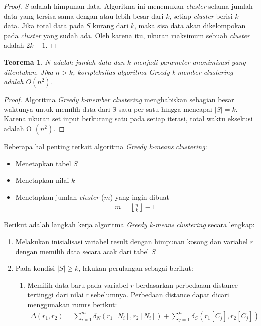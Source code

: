 \documentclass[a4paper,twoside]{article}
\newtheorem{theorem}{Teorema}
\begin{document}
\begin{enumerate}
\begin{proof}
$S$ adalah himpunan data. Algoritma ini menemukan \textit{cluster} selama jumlah data yang tersisa sama dengan atau lebih besar dari $k$, setiap \textit{cluster} berisi $k$ data. Jika total data pada $S$ kurang dari $k$, maka sisa data akan dikelompokan pada  \textit{cluster} yang sudah ada. Oleh karena itu, ukuran maksimum sebuah \textit{cluster} adalah $2k-1$.
\end{proof}

\begin{theorem}
$N$ adalah jumlah data dan $k$ menjadi parameter anonimisasi yang ditentukan. Jika $n > k$, kompleksitas algoritma \textit{Greedy k-member clustering} adalah $O(n^2)$.
\end{theorem}

\begin{proof}
Algoritma \textit{Greedy k-member clustering} menghabiskan sebagian besar waktunya untuk memilih data dari S satu per satu hingga mencapai $|S| = k$. Karena ukuran set input berkurang satu pada setiap iterasi, total waktu eksekusi adalah O $(n^2)$.
\end{proof}

\noindent Beberapa hal penting terkait algoritma \textit{Greedy k-means clustering}:

\begin{itemize}
\item Menetapkan tabel $S$  
\item Menetapkan nilai $k$
\item Menetapkan jumlah \textit{cluster} ($m$) yang ingin dibuat
\begin{align}
m = \left \lfloor \frac{n}{k} \right \rfloor - 1
\end{align}
\end{itemize}


\noindent Berikut adalah langkah kerja algoritma \textit{Greedy k-means clustering} secara lengkap:

\begin{enumerate}
\item Melakukan inisialisasi variabel result dengan himpunan kosong dan variabel $r$ dengan memilih data secara acak dari tabel $S$

\item Pada kondisi $|S| \geq k$, lakukan perulangan sebagai berikut:

\begin{enumerate}
\item Memilih data baru pada variabel $r$ berdasarkan perbedaaan distance tertinggi dari nilai $r$ sebelumnya. Perbedaan distance dapat dicari menggunakan rumus berikut:
\begin{align*}
\Delta (r_1,r_2) = \sum_{i=1}^{m} \delta_N(r_1[N_i],r_2	[N_i]) +  \sum_{j=1}^{n} \delta_C(r_1[C_j],r_2[C_j])
\end{align*}


\end{enumerate}
\end{enumerate}
\end{enumerate}
\end{document}
